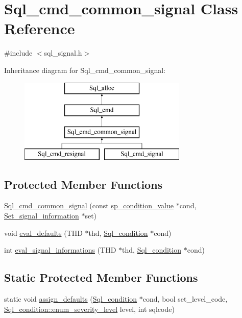 \hypertarget{classSql__cmd__common__signal}{}\section{Sql\+\_\+cmd\+\_\+common\+\_\+signal Class Reference}
\label{classSql__cmd__common__signal}


{\ttfamily \#include $<$sql\+\_\+signal.\+h$>$}

Inheritance diagram for Sql\+\_\+cmd\+\_\+common\+\_\+signal\+:\begin{figure}[H]
\begin{center}
\leavevmode
\includegraphics[height=4.000000cm]{classSql__cmd__common__signal}
\end{center}
\end{figure}
\subsection*{Protected Member Functions}
\begin{DoxyCompactItemize}
\item 
\mbox{\hyperlink{classSql__cmd__common__signal_a0244836afdcb89c3e9ff3b80c90dd908}{Sql\+\_\+cmd\+\_\+common\+\_\+signal}} (const \mbox{\hyperlink{classsp__condition__value}{sp\+\_\+condition\+\_\+value}} $\ast$cond, \mbox{\hyperlink{classSet__signal__information}{Set\+\_\+signal\+\_\+information}} $\ast$set)
\item 
void \mbox{\hyperlink{classSql__cmd__common__signal_adf096fc8dfc88cd1d11bee5d934cfeef}{eval\+\_\+defaults}} (T\+HD $\ast$thd, \mbox{\hyperlink{classSql__condition}{Sql\+\_\+condition}} $\ast$cond)
\item 
int \mbox{\hyperlink{classSql__cmd__common__signal_a6994c11527b7284868e9bed5c3783d7e}{eval\+\_\+signal\+\_\+informations}} (T\+HD $\ast$thd, \mbox{\hyperlink{classSql__condition}{Sql\+\_\+condition}} $\ast$cond)
\end{DoxyCompactItemize}
\subsection*{Static Protected Member Functions}
\begin{DoxyCompactItemize}
\item 
static void \mbox{\hyperlink{classSql__cmd__common__signal_a36f05be6152fe14cf4005c68ba20dbb1}{assign\+\_\+defaults}} (\mbox{\hyperlink{classSql__condition}{Sql\+\_\+condition}} $\ast$cond, bool set\+\_\+level\+\_\+code, \mbox{\hyperlink{classSql__condition_ab0602581e19cddb609bfe10c44be4e83}{Sql\+\_\+condition\+::enum\+\_\+severity\+\_\+level}} level, int sqlcode)
\end{DoxyCompactItemize}
